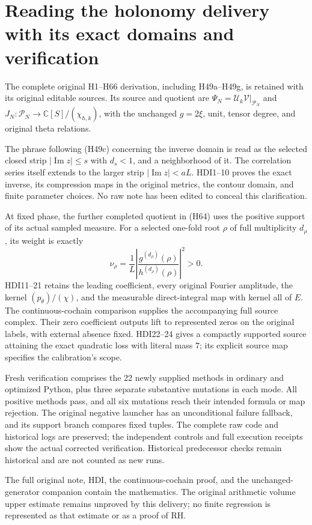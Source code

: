 \documentclass{article}
\begin{document}
\maketitle
\section{Reading the holonomy delivery with its exact domains and verification}
The complete original H1--H66 derivation, including H49a--H49g,
is retained with its original editable sources. Its source and
quotient are \(\Psi_N=\mathcal U_k\mathcal V|_{\mathcal P_N}\)
and \(J_N:\mathcal P_N\to\mathbb C[S]/(\chi_{h,k})\), with
the unchanged \(g=2\xi\), unit, tensor degree, and original
theta relations.

The phrase following (H49c) concerning the inverse domain is read
as the selected closed strip \(|\operatorname{Im}z|\le s\)
with \(d_s<1\), and a neighborhood of it. The correlation
series itself extends to the larger strip
\(|\operatorname{Im}z|<aL\). HDI1--10 proves the exact inverse,
its compression maps in the original metrics, the contour
domain, and finite parameter choices. No raw note has been
edited to conceal this clarification.

At fixed phase, the further completed quotient in (H64) uses the
positive support of its actual sampled measure. For a selected
one-fold root \(\rho\) of full multiplicity \(d_\rho\), its weight
is exactly
\[
 \nu_\rho=\frac1L\left|
 \frac{g^{(d_\rho)}(\rho)}{h^{(d_\rho)}(\rho)}
 \right|^2>0.
\]
HDI11--21 retains the leading coefficient, every original
Fourier amplitude, the kernel \((p_\theta)/(\chi)\), and the
measurable direct-integral map with kernel all of \(E\).
The continuous-cochain comparison supplies the accompanying
full source complex. Their zero coefficient outputs lift to
represented zeros on the original labels, with external
absence fixed. HDI22--24 gives a compactly supported source
attaining the exact quadratic loss with literal mass \(7\);
its explicit source map specifies the calibration's scope.

Fresh verification comprises the 22 newly supplied methods in
ordinary and optimized Python, plus three separate substantive
mutations in each mode. All positive methods pass, and all six
mutations reach their intended formula or map rejection.
The original negative launcher has an unconditional failure
fallback, and its support branch compares fixed tuples.
The complete raw code and historical logs are preserved;
the independent controls and full execution receipts show
the actual corrected verification. Historical predecessor
checks remain historical and are not counted as new runs.

The full original note, HDI, the continuous-cochain proof,
and the unchanged-generator companion contain the mathematics.
The original arithmetic volume upper estimate remains
unproved by this delivery; no finite regression is represented
as that estimate or as a proof of RH.
\end{document}
